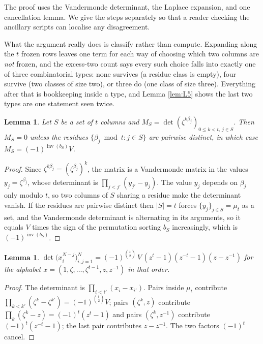 \documentclass[11pt,reqno]{amsart}
\theoremstyle{plain}
\newtheorem{lemma}[theorem]{Lemma}
\theoremstyle{definition}
\newcommand{\zt}{\mu_t}
\newcommand{\inv}{\operatorname{inv}}
\begin{document}
The proof uses the Vandermonde determinant, the Laplace expansion, and one cancellation lemma. We
give the steps separately so that a reader checking the ancillary scripts can localise any
disagreement.

What the argument really does is classify rather than compute. Expanding along the $t$ frozen rows
leaves one term for each way of choosing which two columns are \emph{not} frozen, and the excess-two
count says every such choice falls into exactly one of three combinatorial types: none survives
(a residue class is empty), four survive (two classes of size two), or three do (one class of size
three). Everything after that is bookkeeping inside a type, and Lemma \ref{lem:L5} shows the last two
types are one statement seen twice.

\begin{lemma}\label{lem:L1}
Let $S$ be a set of $t$ columns and $M_S=\det(\zeta^{k\beta_j})_{0\le k<t,\,j\in S}$. Then $M_S=0$
unless the residues $\{\beta_j\bmod t:j\in S\}$ are pairwise distinct, in which case
$M_S=(-1)^{\inv(b_S)}V$.
\end{lemma}

\begin{proof}
Since $\zeta^{k\beta_j}=(\zeta^{\beta_j})^k$, the matrix is a Vandermonde matrix in the values
$y_j=\zeta^{\beta_j}$, whose determinant is $\prod_{j<j'}(y_{j'}-y_j)$. The value $y_j$ depends on
$\beta_j$ only modulo $t$, so two columns of $S$ sharing a residue make the determinant vanish. If
the residues are pairwise distinct then $|S|=t$ forces $\{y_j\}_{j\in S}=\zt$ as a set, and the
Vandermonde determinant is alternating in its arguments, so it equals $V$ times the sign of the
permutation sorting $b_S$ increasingly, which is $(-1)^{\inv(b_S)}$.
\end{proof}

\begin{lemma}\label{lem:L2}
$\det\bigl(x_i^{N-j}\bigr)_{i,j=1}^{N}
=(-1)^{\binom t2}\,V\,(z^t-1)(z^{-t}-1)(z-z^{-1})$ for the alphabet
$x=(1,\zeta,\dots,\zeta^{t-1},z,z^{-1})$ in that order.
\end{lemma}

\begin{proof}
The determinant is $\prod_{i<i'}(x_i-x_{i'})$. Pairs inside $\zt$ contribute
$\prod_{k<k'}(\zeta^k-\zeta^{k'})=(-1)^{\binom t2}V$; pairs $(\zeta^k,z)$ contribute
$\prod_k(\zeta^k-z)=(-1)^t(z^t-1)$ and pairs $(\zeta^k,z^{-1})$ contribute $(-1)^t(z^{-t}-1)$; the
last pair contributes $z-z^{-1}$. The two factors $(-1)^t$ cancel.
\end{proof}
\end{document}
